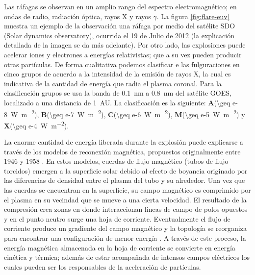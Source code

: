 Las ráfagas se observan en un amplio rango del espectro electromagnético; en ondas de radio, radiación óptica, rayos X y rayos $\gamma$. La figura \ref{fig:flare-euv} muestra un ejemplo de la observación una ráfaga por medio del satélite SDO (Solar dynamics observatory), ocurrida el \num{19} de Julio de \num{2012} (la explicación detallada de la imagen se da más adelante). Por otro lado, las explosiones puede acelerar iones y electrones a energías relativistas; que a su vez pueden producir otras partículas. De forma cualitativa podemos clasificar e las fulguraciones en cinco grupos de acuerdo a la intensidad de la emisión de rayos X, la cual es indicativa de la cantidad de energía que radia el plasma coronal. Para la clasificación grupos se usa la banda de \SI{0.1}{\nano\metre} a \SI{0.8}{\nano\metre} del satélite GOES, localizado a una distancia de \SI{1}{AU}. La clasificación es la siguiente: \textbf{A}(\SI{\geq e-8}{\watt\per\square\metre}), \textbf{B}(\SI{\geq e-7}{\watt\per\square\metre}), \textbf{C}(\SI{\geq e-6}{\watt\per\square\metre}), \textbf{M}(\SI{\geq e-5}{\watt\per\square\metre}) y \textbf{X}(\SI{\geq e-4}{\watt\per\square\metre}).

La enorme cantidad de energía liberada durante la explosión puede explicarse a través de los modelos de reconexión magnética, propuestos originalmente entre \num{1946} y \num{1958} \cite{giovanelli,hoyle,sweet,parker}. En estos modelos, cuerdas de flujo magnético (tubos de flujo torcidos) emergen a la superficie solar debido al efecto de boyancia originado por las diferencias de densidad entre el plasma del tubo y su alrededor. Una vez que las cuerdas se encuentran en la superficie, su campo magnético es comprimido por el plasma en su vecindad que se mueve a una cierta velocidad. El resultado de la compresión crea zonas en donde interaccionan lineas de campo de polos opuestos y en el punto neutro surge una hoja de corriente. Eventualmente el flujo de corriente produce un gradiente del campo magnético y la topología se reorganiza para encontrar una configuración de menor energía \cite{shiba11}. A través de este proceso, la energía magnética almacenada en la hoja de corriente se convierte en energía cinética y térmica; además de estar acompañada de intensos campos eléctricos los cuales pueden ser los responsables de la aceleración de partículas.

